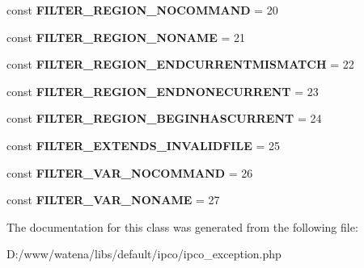 \begin{DoxyCompactItemize}
\item 
\hypertarget{class_i_p_c_o___exception_afa47964307dc6693923b32cd0ea22ddc}{const {\bfseries F\-I\-L\-T\-E\-R\-\_\-\-R\-E\-G\-I\-O\-N\-\_\-\-N\-O\-C\-O\-M\-M\-A\-N\-D} = 20}\label{class_i_p_c_o___exception_afa47964307dc6693923b32cd0ea22ddc}

\item 
\hypertarget{class_i_p_c_o___exception_a0b86c816b08cc1a44602f330c37c351e}{const {\bfseries F\-I\-L\-T\-E\-R\-\_\-\-R\-E\-G\-I\-O\-N\-\_\-\-N\-O\-N\-A\-M\-E} = 21}\label{class_i_p_c_o___exception_a0b86c816b08cc1a44602f330c37c351e}

\item 
\hypertarget{class_i_p_c_o___exception_a3a43cc372c869acbe4feb9555f9fe04e}{const {\bfseries F\-I\-L\-T\-E\-R\-\_\-\-R\-E\-G\-I\-O\-N\-\_\-\-E\-N\-D\-C\-U\-R\-R\-E\-N\-T\-M\-I\-S\-M\-A\-T\-C\-H} = 22}\label{class_i_p_c_o___exception_a3a43cc372c869acbe4feb9555f9fe04e}

\item 
\hypertarget{class_i_p_c_o___exception_afe88c55a4cd049f44cc10d748201f2d6}{const {\bfseries F\-I\-L\-T\-E\-R\-\_\-\-R\-E\-G\-I\-O\-N\-\_\-\-E\-N\-D\-N\-O\-N\-E\-C\-U\-R\-R\-E\-N\-T} = 23}\label{class_i_p_c_o___exception_afe88c55a4cd049f44cc10d748201f2d6}

\item 
\hypertarget{class_i_p_c_o___exception_aeed1eecf329265e3f7ad58f98c3ec8e2}{const {\bfseries F\-I\-L\-T\-E\-R\-\_\-\-R\-E\-G\-I\-O\-N\-\_\-\-B\-E\-G\-I\-N\-H\-A\-S\-C\-U\-R\-R\-E\-N\-T} = 24}\label{class_i_p_c_o___exception_aeed1eecf329265e3f7ad58f98c3ec8e2}

\item 
\hypertarget{class_i_p_c_o___exception_a90a9705afe2922b1e5a28fa95a96e5bb}{const {\bfseries F\-I\-L\-T\-E\-R\-\_\-\-E\-X\-T\-E\-N\-D\-S\-\_\-\-I\-N\-V\-A\-L\-I\-D\-F\-I\-L\-E} = 25}\label{class_i_p_c_o___exception_a90a9705afe2922b1e5a28fa95a96e5bb}

\item 
\hypertarget{class_i_p_c_o___exception_aae5ebf107c6ae427ab9f579dd1addcde}{const {\bfseries F\-I\-L\-T\-E\-R\-\_\-\-V\-A\-R\-\_\-\-N\-O\-C\-O\-M\-M\-A\-N\-D} = 26}\label{class_i_p_c_o___exception_aae5ebf107c6ae427ab9f579dd1addcde}

\item 
\hypertarget{class_i_p_c_o___exception_a4515a5472e1c772746291bd8df422e67}{const {\bfseries F\-I\-L\-T\-E\-R\-\_\-\-V\-A\-R\-\_\-\-N\-O\-N\-A\-M\-E} = 27}\label{class_i_p_c_o___exception_a4515a5472e1c772746291bd8df422e67}

\end{DoxyCompactItemize}


The documentation for this class was generated from the following file\-:\begin{DoxyCompactItemize}
\item 
D\-:/www/watena/libs/default/ipco/ipco\-\_\-exception.\-php\end{DoxyCompactItemize}
